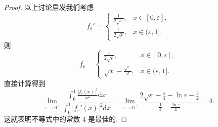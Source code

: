\documentclass[../../main.tex]{subfiles}%
\begin{document}
\begin{proof}
以上讨论启发我们考虑
$$f_\varepsilon' = \begin{cases} 
\frac{1}{2\sqrt{\varepsilon}}, & x \in [0, \varepsilon], \\
\frac{1}{2\sqrt{x}}, & x \in (\varepsilon, 1].
\end{cases}$$
则
$$f_\varepsilon = \begin{cases} 
\frac{x}{2\sqrt{\varepsilon}}, & x \in [0, \varepsilon], \\
\sqrt{x} - \frac{\sqrt{\varepsilon}}{2}, & x \in (\varepsilon, 1].
\end{cases}$$
直接计算得到
$$\lim_{\varepsilon \to 0^+} \frac{\int_0^1 \frac{|f_\varepsilon(x)|^2}{x^2} \mathrm{d}x}{\int_0^1 |f_\varepsilon'(x)|^2 \mathrm{d}x} = \lim_{\varepsilon \to 0^+} \frac{2\sqrt{\varepsilon} - \frac{\varepsilon}{4} - \ln \varepsilon - \frac{3}{2}}{\frac{1}{4} - \frac{\ln \varepsilon}{4}} = 4.$$
这就表明不等式中的常数 $4$ 是最佳的.

\end{proof}
\end{document}
